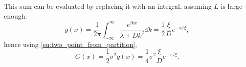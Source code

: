  This sum can be evaluated by replacing it with an integral, assuming $L$ is large enough:
 \begin{equation}
   \label{eq:G_as_integral}
   g(x) = \frac{1}{2\pi}\int_{-\infty}^{\infty}  \frac{e^{ikx}}{\lambda + Dk^2} \dd{k} = \frac{1}{2} \frac{\xi}{D} e^{-x/\xi},
 \end{equation}
 hence using \cref{eq:two_point_from_partition},
 \begin{equation}
   \label{eq:G_from_G}
   G(x) = \frac{1}{2}\sigma^2g(x) =  \frac{1}{4} \sigma^2 \frac{\xi}{D} e^{-x/\xi}.
 \end{equation}

